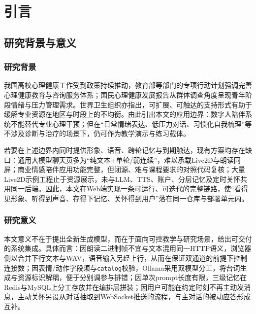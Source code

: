 \documentclass{base}
\begin{document}
\chapter{引言}

\section{研究背景与意义}

\subsection{研究背景}

我国高校心理健康工作受到政策持续推动，教育部等部门的专项行动计划强调完善心理健康教育与咨询服务体系\cite{MOE2023}；国民心理健康发展报告从群体调查角度呈现青年阶段情绪与压力管理需求\cite{NMHReport2023}。世界卫生组织亦指出，可扩展、可触达的支持形式有助于缓解专业资源在地区与时段上的不均衡\cite{WHO2022}。由此引出本文的应用边界：数字人陪伴系统不能替代专业心理干预；但在``日常情绪表达、低压力对话、习惯化自我梳理''等不涉及诊断与治疗的场景下，仍可作为教学演示与练习载体\cite{Picard1997,Bickmore2005}。

若要在上述边界内同时提供形象、语音、跨轮记忆与到期触达，现有方案均存在缺口：通用大模型聊天页多为``纯文本+单轮/弱连续''，难以承载Live2D与朗读同屏\cite{CharacterAIAbout,ReplikaOfficial}；商业情感陪伴应用功能完整，但闭源、难与课程要求的对照代码复核\cite{ReplikaOfficial}；大量Live2D示例工程止于资源展示，未与LLM、TTS、账户、分层记忆及定时关怀共用同一后端\cite{live2d}。因此，本文在Web端实现一条可运行、可迭代的完整链路，使``看得见形象、听得到声音、存得下记忆、关怀得到用户''落在同一仓库与部署单元内。

\subsection{研究意义}

本文意义不在于提出全新生成模型，而在于面向可控教学与研究场景，给出可交付的系统集成。具体而言：因朗读二进制帧不宜与文本混用同一HTTP语义，浏览器侧以合并下行文本与WAV，语音输入另经上行，从而在保证双通道的前提下控制连接数；因表情/动作字段须与\texttt{catalog}校验，Ollama采用双模型分工，将台词生成与资源标识解耦，便于分别调参与排错；因单次prompt长度有限，三级记忆在Redis与MySQL上分工存放并在编排层拼装；因用户可能在约定时刻不再主动发消息，主动关怀另设从对话抽取到WebSocket推送的流程，与主对话的被动应答形成互补。
\end{document}
